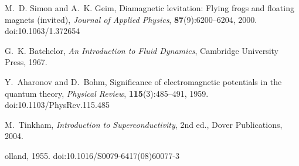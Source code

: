 \documentclass[10pt,reprint,aps,onecolumn,nofootinbib]{revtex4-2}
\begin{document}
\begin{thebibliography}{99}
        M.~D. Simon and A.~K. Geim,
        Diamagnetic levitation: Flying frogs and floating magnets (invited),
        \emph{Journal of Applied Physics}, \textbf{87}(9):6200--6204, 2000.
        doi:10.1063/1.372654

        G.~K. Batchelor,
        \emph{An Introduction to Fluid Dynamics},
        Cambridge University Press, 1967.


        Y.~Aharonov and D.~Bohm,
        Significance of electromagnetic potentials in the quantum theory,
        \emph{Physical Review}, \textbf{115}(3):485--491, 1959.
        doi:10.1103/PhysRev.115.485

        M.~Tinkham,
        \emph{Introduction to Superconductivity}, 2nd ed.,
        Dover Publications, 2004.

 olland, 1955.
        doi:10.1016/S0079-6417(08)60077-3

        \end{thebibliography}
\end{document}
